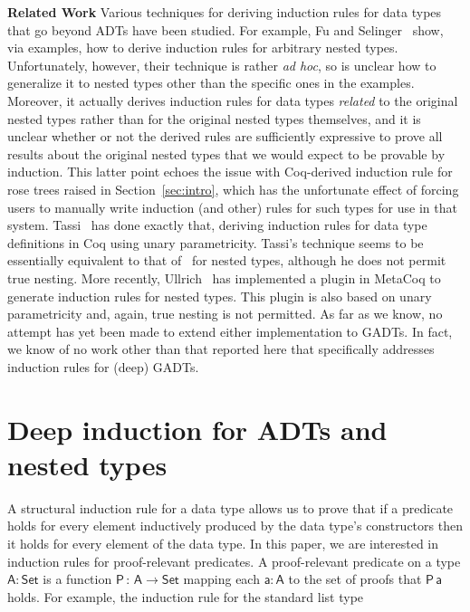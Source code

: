 \documentclass[9pt]{entcs}
\begin{document}
{\bf Related Work\/} Various techniques for deriving induction rules
for data types that go beyond ADTs have been studied. For example, Fu
and Selinger~\cite{fs18} show, via examples, how to derive induction
rules for arbitrary nested types. Unfortunately, however, their
technique is rather {\em ad hoc}, so is unclear how to generalize it
to nested types other than the specific ones in the
examples. Moreover, it actually derives induction rules for data types
{\em related} to the original nested types rather than for the
original nested types themselves, and it is unclear whether or not the
derived rules are sufficiently expressive to prove all results about
the original nested types that we would expect to be provable by
induction. This latter point echoes the issue with Coq-derived
induction rule for rose trees raised in Section~\ref{sec:intro}, which
has the unfortunate effect of forcing users to manually write
induction (and other) rules for such types for use in that
system. Tassi~\cite{tas19} has done exactly that, deriving induction
rules for data type definitions in Coq using unary
parametricity. Tassi's technique seems to be essentially equivalent to
that of~\cite{jp19} for nested types, although he does not permit true
nesting. More recently, Ullrich~\cite{ull20} has implemented a plugin
in MetaCoq to generate induction rules for nested types. This plugin
is also based on unary parametricity and, again, true nesting is not
permitted.  As far as we know, no attempt has yet been made to extend
either implementation to GADTs. In fact, we know of no work other than
that reported here that specifically addresses induction rules for
(deep) GADTs.

\section{Deep induction for ADTs and nested types}\label{sec:ADTs-and-nesteds}

A structural induction rule for a data type allows us to prove that if
a predicate holds for every element inductively produced by the data
type's constructors then it holds for every element of the data type.
In this paper, we are interested in induction rules for proof-relevant
predicates.  A proof-relevant predicate on a type $\mathsf{A : Set}$
is a function $\mathsf{P\,:\,A \to Set}$ mapping each $\mathsf{a : A}$
to the set of proofs that $\mathsf{P\,a}$ holds.  For example, the
induction rule for the standard list type

\vspace*{-0.1in}
\end{document}
